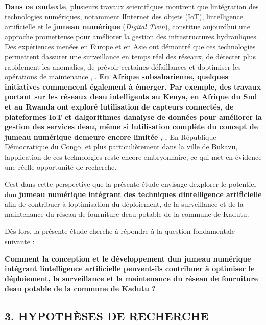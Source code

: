 \documentclass[12pt,a4paper,oneside]{report}
\begin{document}
\textbf{Dans ce contexte}, plusieurs travaux scientifiques montrent que
l\textquotesingle intégration des technologies numériques, notamment
l\textquotesingle Internet des objets (IoT),
l\textquotesingle intelligence artificielle et le \textbf{jumeau
numérique} (\emph{Digital Twin}), constitue aujourd\textquotesingle hui
une approche prometteuse pour améliorer la gestion des infrastructures
hydrauliques. Des expériences menées en Europe et en Asie ont démontré
que ces technologies permettent d\textquotesingle assurer une
surveillance en temps réel des réseaux, de détecter plus rapidement les
anomalies, de prévoir certaines défaillances et
d\textquotesingle optimiser les opérations de maintenance \cite{ref9},
\cite{ref17}. \textbf{En Afrique subsaharienne, quelques initiatives
commencent également à émerger. Par exemple, des travaux portant sur les
réseaux d\textquotesingle eau intelligents au Kenya, en Afrique du Sud
et au Rwanda ont exploré l\textquotesingle utilisation de capteurs
connectés, de plateformes IoT et d\textquotesingle algorithmes
d\textquotesingle analyse de données pour améliorer la gestion des
services d\textquotesingle eau, même si l\textquotesingle utilisation
complète du concept de jumeau numérique demeure encore limitée}
\cite{ref18}\textbf{,} \cite{ref19}\textbf{.} En République Démocratique du
Congo, et plus particulièrement dans la ville de Bukavu,
l\textquotesingle application de ces technologies reste encore
embryonnaire, ce qui met en évidence une réelle opportunité de
recherche.

C\textquotesingle est dans cette perspective que la présente étude
envisage d\textquotesingle explorer le potentiel d\textquotesingle un
\textbf{jumeau numérique intégrant des techniques
d\textquotesingle intelligence artificielle} afin de contribuer à
l\textquotesingle optimisation du déploiement, de la surveillance et de
la maintenance du réseau de fourniture d\textquotesingle eau potable de
la commune de Kadutu.

Dès lors, la présente étude cherche à répondre à la question
fondamentale suivante :

\textbf{Comment la conception et le développement d\textquotesingle un
jumeau numérique intégrant l\textquotesingle intelligence artificielle
peuvent-ils contribuer à optimiser le déploiement, la surveillance et la
maintenance du réseau de fourniture d\textquotesingle eau potable de la
commune de Kadutu ?}

\subsection{3. HYPOTHÈSES DE
RECHERCHE}\label{hypothuxe8ses-de-recherche}
\end{document}
